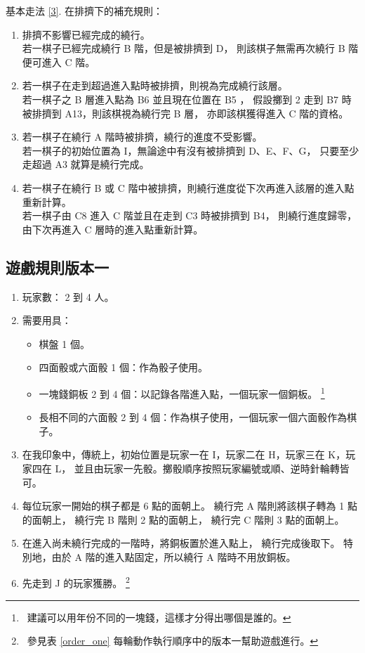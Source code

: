 \documentclass[11pt,a4paper]{article}
\begin{document}
\begin{enumerate}
		基本走法 \ref{3}.\! 在排擠下的補充規則：
		\begin{enumerate}
			\item
				排擠不影響已經完成的繞行。\\
				\zB 若一棋子已經完成繞行 B 階，但是被排擠到 D，
				則該棋子無需再次繞行 B 階便可進入 C 階。
			\item
				若一棋子在走到超過進入點時被排擠，則視為完成繞行該層。\\
				\zB 若一棋子之 B 層進入點為 B6 並且現在位置在 B5 ，
				假設擲到 2 走到 B7 時被排擠到 A13，則該棋視為繞行完 B 層，
				亦即該棋獲得進入 C 階的資格。
			\item
				若一棋子在繞行 A 階時被排擠，繞行的進度不受影響。\\
				\zB 若一棋子的初始位置為 I，無論途中有沒有被排擠到 D、E、F、G，
				只要至少走超過 A3 就算是繞行完成。
			\item
				若一棋子在繞行 B 或 C 階中被排擠，則繞行進度從下次再進入該層的進入點重新計算。\\
				\zB 若一棋子由 C8 進入 C 階並且在走到 C3 時被排擠到 B4，
				則繞行進度歸零，由下次再進入 C 層時的進入點重新計算。
		\end{enumerate}
\end{enumerate}

\subsection{遊戲規則版本一} \label{ver1} %

\begin{enumerate}
	\item 玩家數： 2 到 4 人。
	\item
		需要用具：
		\begin{itemize}
			\item 棋盤 1 個。
			\item 四面骰或六面骰 1 個：作為骰子使用。
			\item 一塊錢銅板 2 到 4 個：以記錄各階進入點，一個玩家一個銅板。
				\footnote{\ 建議可以用年份不同的一塊錢，這樣才分得出哪個是誰的。}
			\item 長相不同的六面骰 2 到 4 個：作為棋子使用，一個玩家一個六面骰作為棋子。
		\end{itemize}
	\item
		在我印象中，傳統上，初始位置是玩家一在 I，玩家二在 H，玩家三在 K，玩家四在 L，
		並且由玩家一先骰。擲骰順序按照玩家編號或順、逆時針輪轉皆可。
	\item \label{facing}
		每位玩家一開始的棋子都是 6 點的面朝上。
		繞行完 A 階則將該棋子轉為 1 點的面朝上，
		繞行完 B 階則 2 點的面朝上，
		繞行完 C 階則 3 點的面朝上。
	\item \label{coin}
		在進入尚未繞行完成的一階時，將銅板置於進入點上，
		繞行完成後取下。
		特別地，由於 A 階的進入點固定，所以繞行 A 階時不用放銅板。
	\item
		先走到 J 的玩家獲勝。
			\footnote{\ 參見表 \ref{order_one} 每輪動作執行順序中的版本一幫助遊戲進行。}
\end{enumerate}
\end{document}

